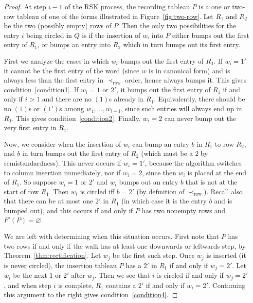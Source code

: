 \documentclass[10pt]{amsart}
\theoremstyle{definition}
\DeclareMathOperator{\row}{row}
\begin{document}
\begin{proof}
At step $i-1$ of the RSK process, the recording tableau $P$ is a one or two-row tableau of one of the forms illustrated in Figure~\ref{fig:two-row}. Let $R_1$ and $R_2$ be the two (possibly empty) rows of $P$. Then the only two possibilities for the entry $i$ being circled in $Q$ is if the insertion of $w_i$ into $P$ either bumps out the first entry of $R_1$, or bumps an entry into $R_2$ which in turn bumps out its first entry.

First we analyze the cases in which $w_i$ bumps out the first entry of $R_1$. If $w_i=1'$ it cannot be the first entry of the word (since $w$ is in canonical form) and is always less than the first entry in $\prec_{\row }$ order, hence always bumps it. This gives condition~\ref{condition1}. If $w_i=1$ or $2'$, it bumps out the first entry of $R_1$ if and only if $i>1$ and there are no $(1)$s already in $R_1$. Equivalently, there should be no $(1)$s or $(1')$s among $w_1, \ldots, w_{i-1}$, since such entries will always end up in $R_1$. This gives condition~\ref{condition2}. Finally, $w_i=2$ can never bump out the very first entry in $R_1$. 

Now, we consider when the insertion of $w_i$ can bump an entry $b$ in $R_1$ to row $R_2$, and $b$ in turn bumps out the first entry of $R_2$ (which must be a $2$ by semistandardness). This never occurs if $w_i=1'$, because the algorithm switches to column insertion immediately, nor if $w_i=2$, since then $w_i$ is placed at the end of $R_1$. So suppose $w_i=1$ or $2'$ and $w_i$ bumps out an entry $b$ that is not at the start of row $R_1$. Then $w_i$ is circled iff $b=2'$ (by definition of $\prec_{\row }$).
Recall also that there can be at most one $2'$ in $R_1$ (in which case it is the entry $b$ and is bumped out), and this occurs if and only if $P$ has two nonempty rows and $F'(P)=\varnothing$.

We are left with determining when this situation occurs. First note that $P$ has two rows if and only if the walk has at least one downwards or leftwards step, by Theorem~\ref{thm:rectification}. Let $w_j$ be the first such step. Once $w_j$ is inserted (it is never circled), the insertion tableau $P$ has a $2'$ in $R_1$ if and only if $w_j=2'$. Let $w_i$ be the next $1$ or $2'$ after $w_j$. Then we see that $i$ is circled if and only if $w_j=2'$, and when step $i$ is complete, $R_1$ contains a $2'$ if and only if $w_i=2'$. Continuing this argument to the right gives condition~\ref{condition4}.
\end{proof}
\end{document}
